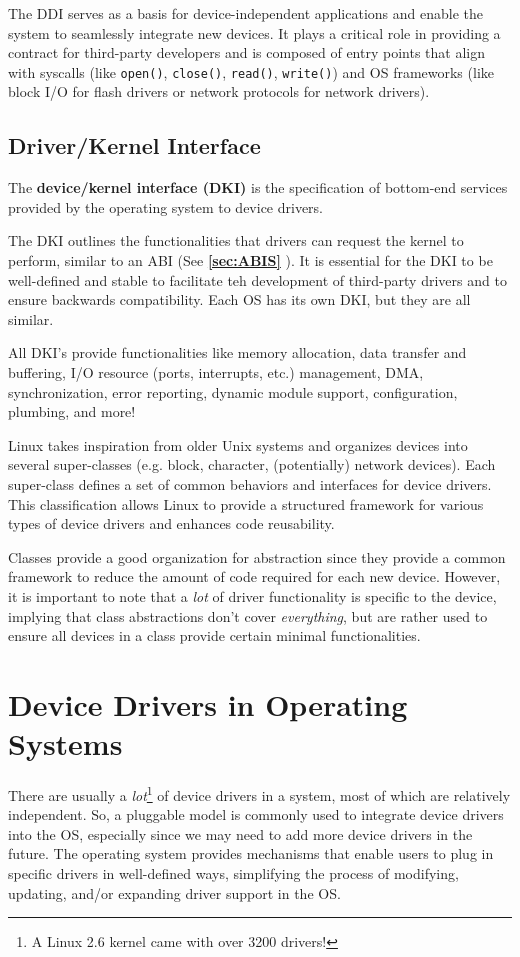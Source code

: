 \documentclass{report}
\newcommand{\definitionBegin}[1]{\begin{tcolorbox}[title={Definition: #1}]}
\newcommand{\definitionEnd}{\end{tcolorbox}}
\newcommand{\exampleBegin}[1]{\begin{tcolorbox}[colback=blue!5!white,colframe=black!75!blue,title={Example:
      #1}]}
\newcommand{\exampleEnd}{\end{tcolorbox}}
\newcommand{\refto}[2]{\textbf{\ref{#1:#2} \nameref{#1:#2}}}
\begin{document}
The DDI serves as a basis for device-independent applications and enable the system to seamlessly
integrate new devices. It plays a critical role in providing a contract for third-party developers
and is composed of entry points that align with syscalls (like \texttt{open()}, \texttt{close()},
\texttt{read()}, \texttt{write()}) and OS frameworks (like block I/O for flash drivers or network
protocols for network drivers).


\subsection{Driver/Kernel Interface}
\definitionBegin{Device/Kernel Interface}
The \textbf{device/kernel interface (DKI)} is the specification of bottom-end services provided by
the operating system to device drivers.
\definitionEnd

The DKI outlines the functionalities that drivers can request the kernel to perform, similar to an
ABI (See \refto{sec}{ABIS}). It is essential for the DKI to be well-defined and stable to facilitate
teh development of third-party drivers and to ensure backwards compatibility. Each OS has its own
DKI, but they are all similar.

\exampleBegin{``You'll Never Find Someone Like Me''}
All DKI's provide functionalities like memory allocation, data transfer and buffering, I/O resource
(ports, interrupts, etc.) management, DMA, synchronization, error reporting, dynamic module support,
configuration, plumbing, and more!
\exampleEnd

\exampleBegin{Linux Device Driver Abstractions}
Linux takes inspiration from older Unix systems and organizes devices into several super-classes
(e.g. block, character, (potentially) network devices). Each super-class defines a set of common
behaviors and interfaces for device drivers. This classification allows Linux to provide a
structured framework for various types of device drivers and enhances code reusability.

Classes provide a good organization for abstraction since they provide a common framework to reduce
the amount of code required for each new device. However, it is important to note that a
\textit{lot} of driver functionality is specific to the device, implying that class abstractions
don't cover \textit{everything}, but are rather used to ensure all devices in a class provide
certain minimal functionalities.
\exampleEnd

\section{Device Drivers in Operating Systems}
There are usually a \textit{lot}\footnote{A Linux 2.6 kernel came with over 3200 drivers!} of device
drivers in a system, most of which are relatively independent. So, a pluggable model is commonly
used to integrate device drivers into the OS, especially since we may need to add more device
drivers in the future. The operating system provides mechanisms that enable users to plug in
specific drivers in well-defined ways, simplifying the process of modifying, updating, and/or
expanding driver support in the OS.
\end{document}
